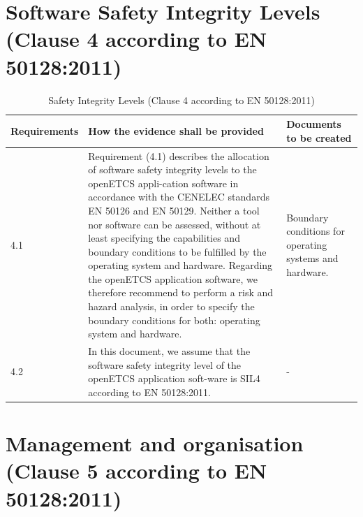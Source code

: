 \documentclass{template/openetcs_report}
\begin{document}
\section{Software Safety Integrity Levels (Clause 4 according to EN 50128:2011)}
\label{clause42}
{\footnotesize\sffamily\centering
\begin{longtable}{|p{2cm}|p{9cm}|p{3cm}|}
\caption{Safety Integrity Levels (Clause 4 according to EN 50128:2011)}\\
\hline
\bfseries Requirements & \bfseries How the evidence shall be provided & \bfseries Documents to be created\\
\hline
\hline
\endhead
\hline
\endfoot

4.1 & Requirement (4.1) describes the allocation of software safety integrity levels to the openETCS appli-cation software in accordance with the CENELEC standards EN 50126 and EN 50129.
\linebreak
\linebreak
Neither a tool nor software can be assessed, without at least specifying the capabilities and boundary conditions to be fulfilled by the operating system and hardware. 
\linebreak
\linebreak
Regarding the openETCS application software, we therefore recommend to perform a risk and hazard analysis, in order to specify the boundary conditions for both: operating system and hardware.
& Boundary conditions for operating systems and hardware.\\ 
\hline
4.2 & In this document, we assume that the software safety integrity level of the openETCS application soft-ware is SIL4 according to EN 50128:2011.
& - \\ 
\hline
\end{longtable}}


\section{Management and organisation (Clause 5 according to EN 50128:2011)}
\label{clause52}
\end{document}
